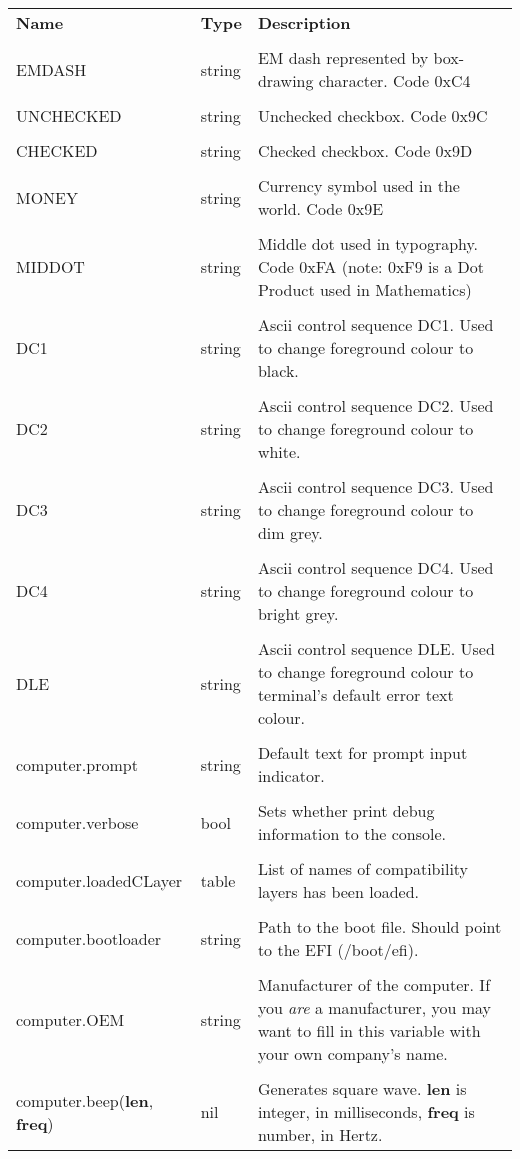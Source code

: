 \begin{tabularx}{\textwidth}{l l X}
	\textbf{\large Name} & \textbf{\large Type} & \textbf{\large Description}
	\\ \\
	\endhead
	\unemph{\_G.}EMDASH & string & EM dash represented by box-drawing character. Code 0xC4
	\\ \\
	\unemph{\_G.}UNCHECKED & string & Unchecked checkbox. Code 0x9C
	\\ \\
	\unemph{\_G.}CHECKED & string & Checked checkbox. Code 0x9D
	\\ \\
	\unemph{\_G.}MONEY & string & Currency symbol used in the world. Code 0x9E
	\\ \\
	\unemph{\_G.}MIDDOT & string & Middle dot used in typography. Code 0xFA (note: 0xF9 is a Dot Product used in Mathematics)
	\\ \\
	\unemph{\_G.}DC1 & string & Ascii control sequence DC1. Used to change foreground colour to black.
	\\ \\
	\unemph{\_G.}DC2 & string & Ascii control sequence DC2. Used to change foreground colour to white.
	\\ \\
	\unemph{\_G.}DC3 & string & Ascii control sequence DC3. Used to change foreground colour to dim grey.
	\\ \\
	\unemph{\_G.}DC4 & string & Ascii control sequence DC4. Used to change foreground colour to bright grey.
	\\ \\
	\unemph{\_G.}DLE & string & Ascii control sequence DLE. Used to change foreground colour to terminal's default error text colour.
	\\ \\
	computer.prompt & string & Default text for prompt input indicator.
	\\ \\
	computer.verbose & bool & Sets whether print debug information to the console.
	\\ \\
	computer.loadedCLayer & table & List of names of compatibility layers has been loaded.
	\\ \\
	computer.bootloader & string & Path to the boot file. Should point to the EFI (/boot/efi).
	\\ \\
	computer.OEM & string & Manufacturer of the computer. If you \emph{are} a manufacturer, you may want to fill in this variable with your own company's name.
	\\ \\
	computer.beep(\textbf{len}, \textbf{freq}) & nil & Generates square wave. \textbf{len} is integer, in milliseconds, \textbf{freq} is number, in Hertz.
\end{tabularx}

